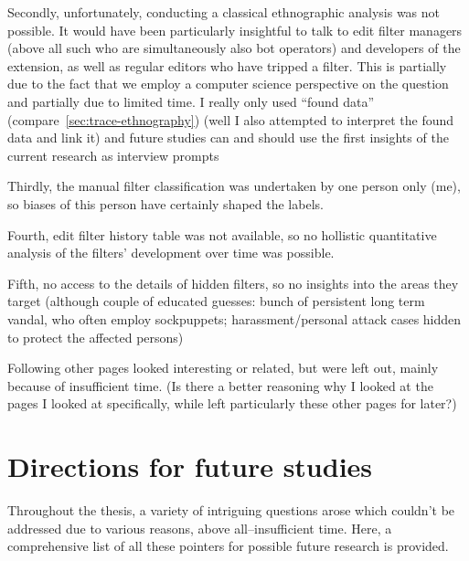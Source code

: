 Secondly, unfortunately, conducting a classical ethnographic analysis was not possible.
It would have been particularly insightful to talk to edit filter managers (above all such who are simultaneously also bot operators) and developers of the extension, as well as regular editors who have tripped a filter.
This is partially due to the fact that we employ a computer science perspective on the question and partially due to limited time.
I really only used ``found data'' (compare~\ref{sec:trace-ethnography}) (well I also attempted to interpret the found data and link it) and future studies can and should use the first insights of the current research as interview prompts

Thirdly, the manual filter classification was undertaken by one person only (me), so biases of this person have certainly shaped the labels.

Fourth, edit filter history table was not available, so no hollistic quantitative analysis of the filters' development over time was possible.

Fifth, no access to the details of hidden filters, so no insights into the areas they target (although couple of educated guesses: bunch of persistent long term vandal, who often employ sockpuppets; harassment/personal attack cases hidden to protect the affected persons)

Following other pages looked interesting or related, but were left out, mainly because of insufficient time.
(Is there a better reasoning why I looked at the pages I looked at specifically, while left particularly these other pages for later?)



\section{Directions for future studies}
\label{sec:further-studies}

Throughout the thesis, a variety of intriguing questions arose which couldn't be addressed due to various reasons, above all–insufficient time.
Here, a comprehensive list of all these pointers for possible future research is provided.

